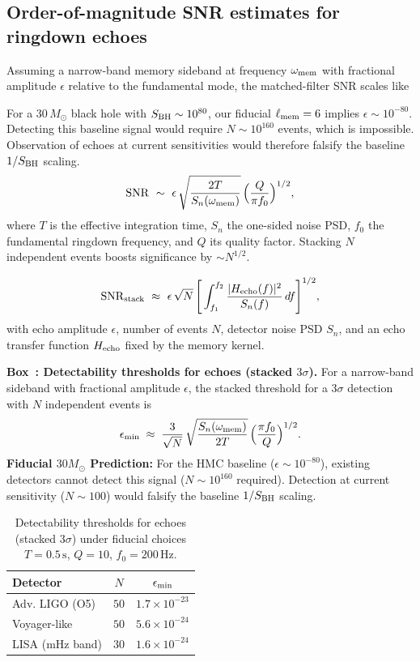 \documentclass[aps,prd,preprint,onecolumn,superscriptaddress,nofootinbib,longbibliography,floatfix,11pt,showpacs,showkeys]{revtex4-2}
\newcounter{boxedresult}
\newenvironment{boxedresult}[1]{\refstepcounter{boxedresult}\begin{infobox}\noindent\textbf{Box~\theboxedresult: #1.}}{\end{infobox}}
\theoremstyle{plain}
\theoremstyle{definition}
\theoremstyle{remark}
\begin{document}
\subsection{Order-of-magnitude SNR estimates for ringdown echoes}
\label{sec:snr_estimates}
Assuming a narrow-band memory sideband at frequency $\omega_{\rm mem}$ with fractional amplitude $\epsilon$ relative to the fundamental mode,
the matched-filter SNR scales like

For a $30\,M_\odot$ black hole with $S_{\rm BH} \sim 10^{80}$, our fiducial $\ell_{\rm mem}=6$ implies $\epsilon \sim 10^{-80}$.
Detecting this baseline signal would require $N \sim 10^{160}$ events, which is impossible.
Observation of echoes at current sensitivities would therefore falsify the baseline $1/S_{\rm BH}$ scaling.
\[
{\rm SNR}\ \sim\ \epsilon\,\sqrt{\frac{2 T}{S_n(\omega_{\rm mem})}}\,\Big(\frac{Q}{\pi f_0}\Big)^{1/2},
\]
where $T$ is the effective integration time, $S_n$ the one-sided noise PSD, $f_0$ the fundamental ringdown frequency, and $Q$ its quality factor.
Stacking $N$ independent events boosts significance by $\sim N^{1/2}$.

\begin{equation}
\label{eq:snr-stack}
\mathrm{SNR}_{\rm stack}\ \approx\ \epsilon\,\sqrt{N}\,\Bigg[\int_{f_1}^{f_2}\frac{|H_{\rm echo}(f)|^2}{S_n(f)}\,df\Bigg]^{1/2},
\end{equation}
with echo amplitude \(\epsilon\), number of events \(N\), detector noise PSD \(S_n\), and an echo transfer function \(H_{\rm echo}\) fixed by the memory kernel.

\begin{boxedresult}{Detectability thresholds for echoes (stacked $3\sigma$)}
For a narrow-band sideband with fractional amplitude $\epsilon$, the stacked threshold for a $3\sigma$ detection with $N$ independent events is
\[
\epsilon_{\rm min} \;\approx\;
\frac{3}{\sqrt{N}}\,
\sqrt{\frac{S_n(\omega_{\rm mem})}{2T}}\,
\Big(\frac{\pi f_0}{Q}\Big)^{1/2}.
\]
\textbf{Fiducial $30 M_{\odot}$ Prediction:} For the HMC baseline ($\epsilon \sim 10^{-80}$), existing detectors cannot detect this signal ($N \sim 10^{160}$ required). 
Detection at current sensitivity ($N \sim 100$) would falsify the baseline $1/S_{\rm BH}$ scaling.
\end{boxedresult}

\begin{table}[!htbp]
\centering
\caption{Detectability thresholds for echoes (stacked $3\sigma$) under fiducial choices $T=0.5\,\mathrm{s}$, $Q=10$, $f_0=200\,\mathrm{Hz}$.}
\label{tab:echo_thresholds}
\small
\begin{tabular}{lcc}
\toprule
Detector & $N$ & $\epsilon_{\rm min}$ \\
\midrule
Adv. LIGO (O5) & $50$ & $1.7\times 10^{-23}$ \\
Voyager-like & $50$ & $5.6\times 10^{-24}$ \\
LISA (mHz band) & $30$ & $1.6\times 10^{-24}$ \\
\bottomrule
\end{tabular}
\end{table}
\end{document}
